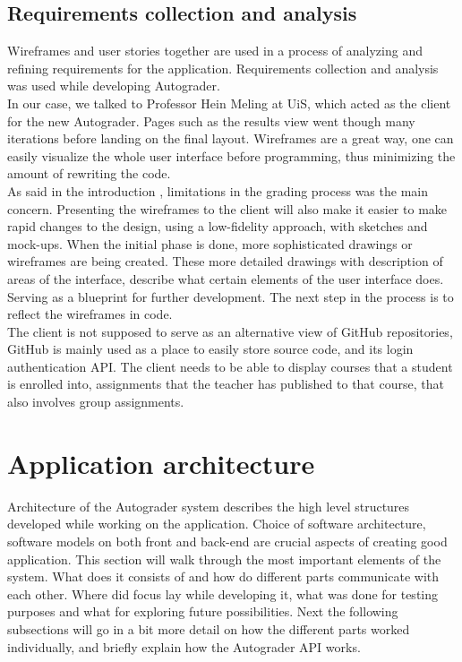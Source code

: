 \subsection{Requirements collection and analysis}

Wireframes and user stories together are used in a process of analyzing and refining requirements for the application. Requirements collection and analysis was used while developing Autograder. 
\\In our case, we talked to Professor Hein Meling at UiS, which acted as the client for the new Autograder. Pages such as the results view  went though many iterations before landing on the final layout. Wireframes are a great way, one can easily visualize the whole user interface before programming, thus minimizing the amount of rewriting the code.
\\As said in the introduction , limitations in the grading process was the main concern. Presenting the wireframes to the client will also make it easier to make rapid changes to the design, using a low-fidelity approach, with sketches and mock-ups. When the initial phase is done, more sophisticated drawings or wireframes are being created. These more detailed drawings with description of areas of the interface, describe what certain elements of the user interface does. Serving as a blueprint for further development. The next step in the process is to reflect the wireframes in code.
\\The client is not supposed to serve as an alternative view of GitHub repositories, GitHub is mainly used as a place to easily store source code, and its login authentication API. The client needs to be able to display courses that a student is enrolled into, assignments that the teacher has published to that course, that also involves group assignments.

\section{Application architecture}
Architecture of the Autograder system describes the high level structures developed while working on the application. Choice of software architecture, software models on both front and back-end are crucial aspects of creating good application. This section will walk through the most important elements of the system. What does it consists of and how do different parts communicate with each other. Where did focus lay while developing it, what was done for testing purposes and what for exploring future possibilities. Next the following subsections will go in a bit more detail on how the different parts worked individually, and briefly explain how the Autograder API works.

